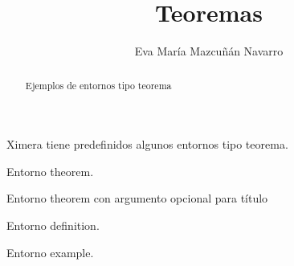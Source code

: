 \documentclass{ximera}
\author{Eva María Mazcuñán Navarro}
\title[Ejemplos:]{Teoremas}
\begin{document}
\begin{abstract}
  Ejemplos de entornos tipo teorema
\end{abstract}

\maketitle

Ximera tiene predefinidos algunos entornos tipo teorema.

\begin{theorem}
  Entorno {\ttfamily theorem}.%
\end{theorem}
%

\begin{theorem}[My theorem]
  Entorno {\ttfamily theorem} con argumento opcional para título
\end{theorem}
%
%
%
%
%
%
%
%

\begin{definition}
  Entorno {\ttfamily definition}.
\end{definition}

\begin{example}
  Entorno {\ttfamily example}.
\end{example}
\end{document}
